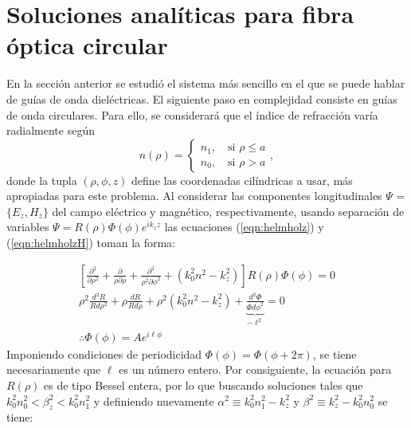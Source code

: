 \section{Soluciones analíticas para fibra óptica circular}
En la sección anterior se estudió el sistema más sencillo en el que se puede hablar de guías de onda dieléctricas. El siguiente paso en complejidad consiste en guías de onda circulares. Para ello, se considerará que el índice de refracción varía radialmente según 
\begin{equation}
	n( \rho ) = 
	\left\{\begin{matrix}
	n_1, \quad \text{si } \rho \le a
	\\
	n_0, \quad \text{si } \rho > a
	\end{matrix}\right.
	,\nonumber
\end{equation}
donde la tupla $(\rho, \phi, z)$ define las coordenadas cilíndricas a usar, más apropiadas para este problema. Al considerar las componentes longitudinales $\Psi$ = $\{E_z, H_z\}$ del campo eléctrico y magnético, respectivamente, usando separación de variables $\Psi =  R(\rho)\Phi(\phi) e^{ik_z z} $ las ecuaciones (\ref{eqn:helmholz}) y (\ref{eqn:helmholzH}) toman la forma:

\begin{align}
	\left[\frac{\partial^2}{\partial \rho^2} + \frac{\partial}{\rho\partial \rho} + \frac{\partial^2}{\rho^2\partial \phi^2} +\left( k_0^2n^2 - k_z^2 \right)\right]  R(\rho)\Phi(\phi) = 0
	\nonumber
	\\
\rho^2\frac{d^2 R}{Rd\rho^2} + \rho\frac{dR}{Rd\rho} + \rho^2\left( k_0^2n^2 - k_z^2 \right) + \underbrace{\frac{d^2 \Phi}{\Phi d\phi^2}}_{-\ell^2} = 0
\nonumber
\\
\therefore \Phi(\phi) = A e^{i\ell\phi}
\nonumber
\end{align}
Imponiendo condiciones de periodicidad $\Phi(\phi)=\Phi(\phi + 2\pi)$, se tiene necesariamente que $\ell$ es un número entero. Por consiguiente, la ecuación para $R(\rho)$ es de tipo Bessel entera, por lo que buscando soluciones tales que $k_0^2 n_0^2 < \beta_z^2 < k_0^2 n_1^2$ y definiendo nuevamente $\alpha^2 \equiv k_0^2n_1^2 - k_z^2$ y $\beta^2\equiv k_z^2 - k_0^2n_0^2$ se tiene:

